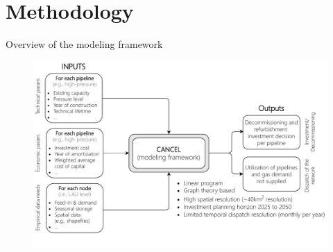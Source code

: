\documentclass[aspectratio=169]{beamer}
\begin{document}
	

\section[Methodology]{Methodology}
\begin{frame}[t]{Overview of the modeling framework}
		\vspace{-0.3cm}
	\begin{figure}
		\centering
		\includegraphics[scale=0.55]{flowchart}
	\end{figure}
\end{frame}
\end{document}
